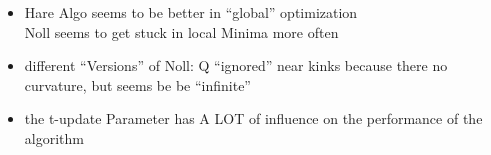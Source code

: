 %
%
%
%
%
%
%
%
%
%

\begin{itemize}
	\item Hare Algo seems to be better in ``global'' optimization \\
	Noll seems to get stuck in local Minima more often
	\item different ``Versions'' of Noll: Q ``ignored'' near kinks because there no curvature, but seems be be ``infinite''
	\item the t-update Parameter has A LOT of influence on the performance of the algorithm
\end{itemize}